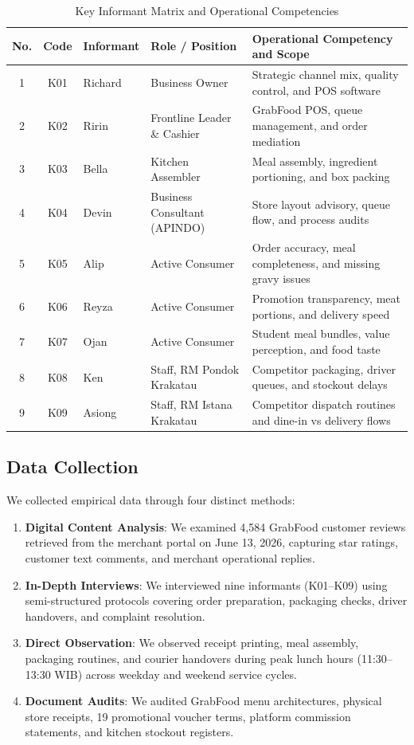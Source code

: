\documentclass{jomas}
\begin{document}
\begin{table}[H]
\caption{Key Informant Matrix and Operational Competencies}
\label{tab:informant-profile}
\centering
\small
\renewcommand{\arraystretch}{0.95}
\setlength{\tabcolsep}{4pt}
\begin{tabularx}{\textwidth}{c c l l X}
\toprule
\textbf{No.} & \textbf{Code} & \textbf{Informant} & \textbf{Role / Position} & \textbf{Operational Competency and Scope} \\
\midrule
1 & K01 & Richard & Business Owner & Strategic channel mix, quality control, and POS software \\
2 & K02 & Ririn & Frontline Leader \& Cashier & GrabFood POS, queue management, and order mediation \\
3 & K03 & Bella & Kitchen Assembler & Meal assembly, ingredient portioning, and box packing \\
4 & K04 & Devin & Business Consultant (APINDO) & Store layout advisory, queue flow, and process audits \\
5 & K05 & Alip & Active Consumer & Order accuracy, meal completeness, and missing gravy issues \\
6 & K06 & Reyza & Active Consumer & Promotion transparency, meat portions, and delivery speed \\
7 & K07 & Ojan & Active Consumer & Student meal bundles, value perception, and food taste \\
8 & K08 & Ken & Staff, RM Pondok Krakatau & Competitor packaging, driver queues, and stockout delays \\
9 & K09 & Asiong & Staff, RM Istana Krakatau & Competitor dispatch routines and dine-in vs delivery flows \\
\bottomrule
\end{tabularx}
\end{table}

\subsection{Data Collection}
We collected empirical data through four distinct methods:
\begin{enumerate}[leftmargin=*,itemsep=1pt,topsep=1pt]
    \item \textbf{Digital Content Analysis}: We examined 4,584 GrabFood customer reviews retrieved from the merchant portal on June 13, 2026, capturing star ratings, customer text comments, and merchant operational replies.
    \item \textbf{In-Depth Interviews}: We interviewed nine informants (K01--K09) using semi-structured protocols covering order preparation, packaging checks, driver handovers, and complaint resolution.
    \item \textbf{Direct Observation}: We observed receipt printing, meal assembly, packaging routines, and courier handovers during peak lunch hours (11:30--13:30 WIB) across weekday and weekend service cycles.
    \item \textbf{Document Audits}: We audited GrabFood menu architectures, physical store receipts, 19 promotional voucher terms, platform commission statements, and kitchen stockout registers.
\end{enumerate}
\end{document}
